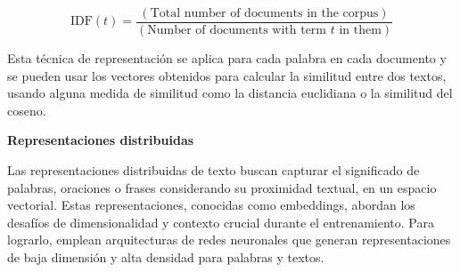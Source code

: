 \begin{itemize}
\begin{equation} \label{eq:e24}
	\textrm{IDF}(t)=\frac{(\textrm{Total number of documents in the corpus})}{(\textrm{Number of documents with term } t \textrm{ in them})}
\end{equation}

Esta técnica de representación se aplica para cada palabra en cada documento y se  pueden usar los vectores obtenidos para calcular la similitud entre dos textos, usando alguna medida de similitud como la distancia euclidiana o la similitud del coseno.


\end{itemize}

\textbf{Representaciones distribuidas}

Las representaciones distribuidas de texto buscan capturar el significado de palabras, oraciones o frases considerando su proximidad textual, en un espacio vectorial. Estas representaciones, conocidas como embeddings, abordan los desafíos de dimensionalidad y contexto crucial durante el entrenamiento. Para lograrlo, emplean arquitecturas de redes neuronales que generan representaciones de baja dimensión y alta densidad para palabras y textos.

